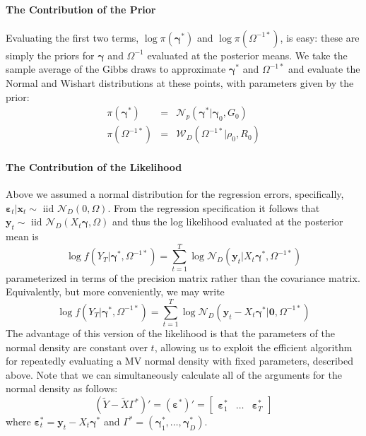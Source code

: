 \documentclass[12pt]{article}
\begin{document}
\paragraph{The Contribution of the Prior}
Evaluating the first two terms, $\log \pi(\boldsymbol{\gamma}^*)$ and $\log \pi\left( \Omega^{-1*} \right)$, is easy: these are simply the priors for $\boldsymbol{\gamma}$ and $\Omega^{-1}$ evaluated at the posterior means.
We take the sample average of the Gibbs draws to approximate $\boldsymbol{\gamma}^*$ and $\Omega^{-1*}$ and evaluate the Normal and Wishart distributions at these points, with parameters given by the prior:
\begin{eqnarray*}
  \pi\left( \boldsymbol{\gamma}^* \right) &=& \mathcal{N}_p\left( \boldsymbol{\gamma}^* | \boldsymbol{\gamma}_0, G_0 \right)\\
  \pi\left( \Omega^{-1*} \right) &=& \mathcal{W}_D\left( \Omega^{-1*}|\rho_0, R_0 \right)
\end{eqnarray*}

\paragraph{The Contribution of the Likelihood}
Above we assumed a normal distribution for the regression errors, specifically, $\boldsymbol{\varepsilon}_t|\mathbf{x}_t \sim \mbox{ iid } \mathcal{N}_D(0,\Omega)$.
From the regression specification it follows that $\mathbf{y}_t \sim \mbox{ iid } \mathcal{N}_D\left(X_t \boldsymbol{\gamma}, \Omega\right)$ and thus the log likelihood evaluated at the posterior mean is
\begin{equation*}
  \log f(Y_T| \boldsymbol{\gamma}^*,\Omega^{-1*}) = \sum_{t=1}^{T} \log{ \mathcal{N}_D \left(\mathbf{y}_t|X_t \boldsymbol{\gamma}^*, \Omega^{-1*}\right)}
\end{equation*}
parameterized in terms of the precision matrix rather than the covariance matrix.
Equivalently, but more conveniently, we may write
\begin{equation*}
  \log f(Y_T| \boldsymbol{\gamma}^*,\Omega^{-1*}) = \sum_{t=1}^{T} \log{ \mathcal{N}_D \left(\mathbf{y}_t -X_t \boldsymbol{\gamma}^*|\mathbf{0}, \Omega^{-1*}\right)}
\end{equation*}
The advantage of this version of the likelihood is that the parameters of the normal density are constant over $t$, allowing us to exploit the efficient algorithm for repeatedly evaluating a MV normal density with fixed parameters, described above.
Note that we can simultaneously calculate all of the arguments for the normal density as follows:
\begin{equation*}
  (\widetilde{Y} - \widetilde{X} \Gamma^*)'= (\boldsymbol{\varepsilon}^{*})' = \left[
\begin{array}{ccc}
  \boldsymbol{\varepsilon}_1^* &
  \hdots &
  \boldsymbol{\varepsilon}_T^*
\end{array}\right]
\end{equation*}
where $\boldsymbol{\varepsilon}_t^* = \mathbf{y}_t - X_t \boldsymbol{\gamma}^*$ and $\Gamma^* = \left( \boldsymbol{\gamma}_1^*, \hdots,  \boldsymbol{\gamma}_D^*\right)$.
\end{document}
